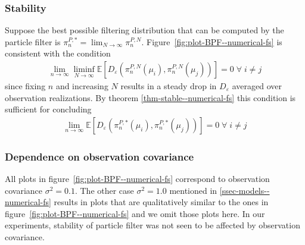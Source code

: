 \subsubsection{Stability}
Suppose the best possible filtering distribution that can be computed by the particle filter is $\pi^{P,*}_n=\lim_{N\to\infty}\pi^{P,N}_n$. Figure~\ref{fig:plot-BPF--numerical-fs} is consistent with the condition
\begin{align*}
    \lim_{n\to\infty}\liminf_{N\to\infty}\mathbb E[D_\varepsilon(\pi^{P,N}_n(\mu_i), \pi^{P,N}_n(\mu_j))]=0\;\forall\; i\neq j
\end{align*}
since fixing $n$ and increasing $N$ results in a steady drop in $D_\varepsilon$ averaged over observation realizations. By theorem \ref{thm-stable--numerical-fs} this condition is sufficient for concluding
\begin{align*}
    \lim_{n\to\infty}\mathbb E[D_\varepsilon(\pi^{P,*}_n(\mu_i), \pi^{P,*}_n(\mu_j))]=0\;\forall\; i\neq j
\end{align*}
\subsubsection{Dependence on observation covariance} All plots in figure~\ref{fig:plot-BPF--numerical-fs} correspond to observation covariance $\sigma^2=0.1$. The other case $\sigma^2=1.0$ mentioned in \ref{ssec-models--numerical-fs} results in plots that are qualitatively similar to the ones in figure~\ref{fig:plot-BPF--numerical-fs} and we omit those plots here. In our experiments, stability of particle filter was not seen to be affected by observation covariance. 


